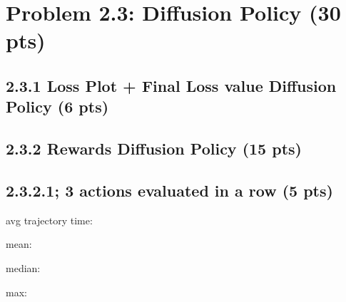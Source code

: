 \documentclass[12pt]{article}
\begin{document}
\newpage
\section*{Problem 2.3: Diffusion Policy (30 pts)}

\subsection*{2.3.1 Loss Plot + Final Loss value Diffusion Policy (6 pts)}
\begin{tcolorbox}[fit,height=30em, width=40em, blank, borderline={1pt}{1pt},nobeforeafter]
            \begin{solution}

            \end{solution}
            
            \end{tcolorbox}


\subsection*{2.3.2 Rewards Diffusion Policy (15 pts)}
\subsection*{2.3.2.1; 3 actions evaluated in a row (5 pts)}

avg trajectory time: \begin{tcolorbox}[fit,height=1cm, width=2cm, blank, borderline={1pt}{1pt},nobeforeafter]
    \begin{center}
    \vspace{3mm}
    \large{}
    \end{center}
\end{tcolorbox}
mean: \begin{tcolorbox}[fit,height=1cm, width=2cm, blank, borderline={1pt}{1pt},nobeforeafter]
    \begin{center}
    \vspace{3mm}
    \large{}
    \end{center}
\end{tcolorbox}
median: \begin{tcolorbox}[fit,height=1cm, width=2cm, blank, borderline={1pt}{1pt},nobeforeafter]
    \begin{center}
    \vspace{3mm}
    \large{}
    \end{center}
\end{tcolorbox}
max: \begin{tcolorbox}[fit,height=1cm, width=2cm, blank, borderline={1pt}{1pt},nobeforeafter]
    \begin{center}
    \vspace{3mm}
    \large{}
    \end{center}
\end{tcolorbox}
    \\
\end{document}
